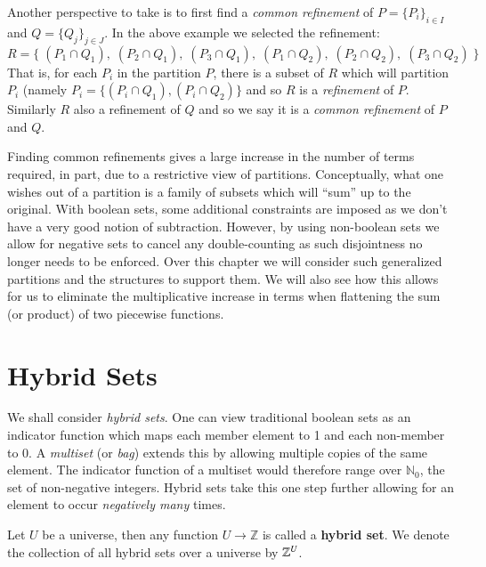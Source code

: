 Another perspective to take is to first find a \emph{common refinement} of ${P=\{P_i\}_{i\in I}}$ 
and ${Q=\{Q_j\}_{j\in J}}$. In the above example we selected the refinement:
\begin{equation*}
	R=\Big\{\;
		(P_1 \cap Q_1),\;(P_2 \cap Q_1),\;(P_3 \cap Q_1),\;
		(P_1 \cap Q_2),\;(P_2 \cap Q_2),\;(P_3 \cap Q_2) \;
	\Big\}
\end{equation*}
That is, for each $P_i$ in the partition $P$, there is a subset of $R$ which will partition $P_i$ 
(namely $P_i = \{ (P_i \cap Q_1), (P_i \cap Q_2) \}$ and so $R$ is a \emph{refinement} of $P$.
Similarly $R$ also a refinement of $Q$ and so we say it is a \emph{common refinement} of $P$ and $Q$.


Finding common refinements gives a large increase in the number of terms required, 
in part, due to a restrictive view of partitions.
Conceptually, what one wishes out of a partition is a family of subsets which will ``sum'' up to the original.
With boolean sets, some additional constraints are imposed as we don't have a very good notion of subtraction.
However, by using non-boolean sets we allow for negative sets to cancel any double-counting
as such disjointness no longer needs to be enforced.
Over this chapter we will consider such generalized partitions and the structures to support them.
We will also see how this allows for us to eliminate the multiplicative increase in terms when flattening the sum
(or product) of two piecewise functions.





%
%
\section{Hybrid Sets}


We shall consider \emph{hybrid sets}.
One can view traditional boolean sets as an indicator function 
which maps each member element to 1 and each non-member to 0.
A \emph{multiset} (or \emph{bag}) extends this by allowing multiple copies of the same element.
The indicator function of a multiset would therefore range over $\mathbb{N}_0$, the set of non-negative integers.
Hybrid sets take this one step further allowing for an element to occur \emph{negatively many} times.


\begin{definition}
	Let $U$ be a universe, then any function $U \to \mathbb{Z}$ is called a \textbf{hybrid set}.
	We denote the collection of all hybrid sets over a universe by $\hsetover[U]$.
\end{definition}


